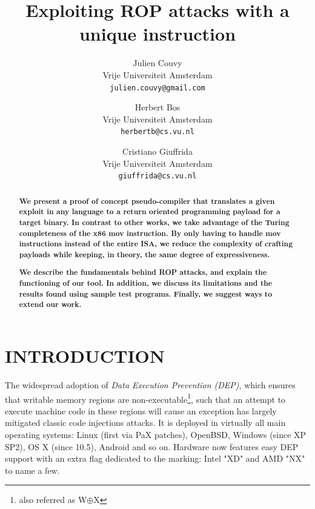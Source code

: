 \documentclass[10pt,twocolumn]{article}
\begin{document}
\author{
        Julien Couvy\\
        Vrije Universiteit Amsterdam\\
        \texttt{julien.couvy@gmail.com}
        \and
        Herbert Bos\\
        Vrije Universiteit Amsterdam\\
        \texttt{herbertb@cs.vu.nl}
        \and
        Cristiano Giuffrida\\
        Vrije Universiteit Amsterdam\\
        \texttt{giuffrida@cs.vu.nl}
}
\title{\Huge Exploiting ROP attacks with a unique instruction\vspace{.75em}}
\maketitle

\begin{abstract}

  \textbf{We present a proof of concept pseudo-compiler that translates a given
    exploit in any language to a return oriented programming payload for a
    target binary. In contrast to other works, we take advantage of the Turing
    completeness of the x86 mov instruction. By only having to handle mov
    instructions instead of the entire ISA, we reduce the complexity of crafting
  payloads while keeping, in theory, the same degree of expressiveness.}

  \textbf{We describe the fundamentals behind ROP attacks, and explain the
    functioning of our tool. In addition, we discuss its limitations and the
    results found using  sample test programs. Finally, we suggest ways to extend
  our work.}

\end{abstract}

\section{INTRODUCTION}

The widespread adoption of \textit{Data Execution Prevention (DEP)}, which
ensures that writable memory regions are non-executable\footnote{also referred
as W$\oplus$X}, such that an attempt to execute machine code in these regions
will cause an exception has largely mitigated classic code injections attacks.
It is deployed in virtually all main operating systems: Linux (first via PaX
patches), OpenBSD, Windows (since XP SP2), OS X (since 10.5), Android and so
on. Hardware now features easy DEP support with an extra flag dedicated to the
marking: Intel "XD" and AMD "NX" to name a few.
\end{document}
